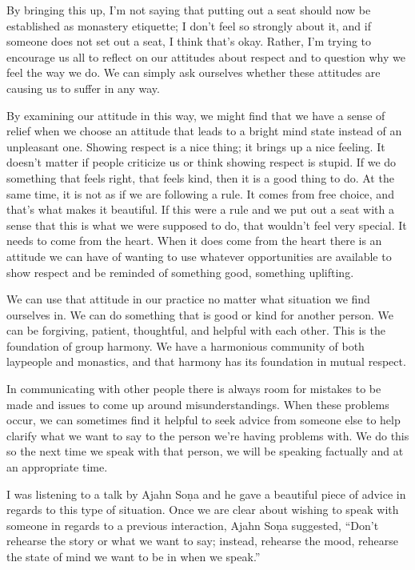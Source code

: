 By bringing this up, I'm not saying that putting out a seat should now 
be established as monastery etiquette; I don't feel so strongly about 
it, and if someone does not set out a seat, I think that's okay. 
Rather, I'm trying to encourage us all to reflect on our attitudes 
about respect and to question why we feel the way we do. We can simply 
ask ourselves whether these attitudes are causing us to suffer in any 
way.

By examining our attitude in this way, we might find that we have a 
sense of relief when we choose an attitude that leads to a bright mind 
state instead of an unpleasant one. Showing respect is a nice thing; it 
brings up a nice feeling. It doesn't matter if people criticize us or 
think showing respect is stupid. If we do something that feels right, 
that feels kind, then it is a good thing to do. At the same time, it is 
not as if we are following a rule. It comes from free choice, and 
that's what makes it beautiful. If this were a rule and we put out a 
seat with a sense that this is what we were supposed to do, that 
wouldn't feel very special. It needs to come from the heart. When it 
does come from the heart there is an attitude we can have of wanting to 
use whatever opportunities are available to show respect and be 
reminded of something good, something uplifting.

We can use that attitude in our practice no matter what situation we 
find ourselves in. We can do something that is good or kind for another 
person. We can be forgiving, patient, thoughtful, and helpful with each 
other. This is the foundation of group harmony. We have a harmonious 
community of both laypeople and monastics, and that harmony has its 
foundation in mutual respect.


In communicating with other people there is always room for mistakes to 
be made and issues to come up around misunderstandings. When these 
problems occur, we can sometimes find it helpful to seek advice from 
someone else to help clarify what we want to say to the person we're 
having problems with. We do this so the next time we speak with that 
person, we will be speaking factually and at an appropriate time.

I was listening to a talk by Ajahn Soṇa and he gave a beautiful piece 
of advice in regards to this type of situation. Once we are clear about 
wishing to speak with someone in regards to a previous interaction, 
Ajahn Soṇa suggested, ``Don't rehearse the story or what we want to 
say; instead, rehearse the mood, rehearse the state of mind we want to 
be in when we speak.''

